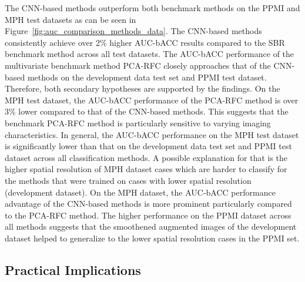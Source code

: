 The CNN-based methods outperform both benchmark methods on the PPMI and MPH test datasets 
as can be seen in Figure~\ref{fig:auc_comparison_methods_data}.
The CNN-based methods consistently achieve over 2\% higher AUC-bACC results compared to the SBR benchmark method
across all test datasets.
The AUC-bACC performance of the multivariate benchmark method PCA-RFC closely approaches that of the CNN-based methods 
on the development data test set and PPMI test dataset.
Therefore, both secondary hypotheses are supported by the findings.
On the MPH test dataset, the AUC-bACC performance of the PCA-RFC method is over 3\% lower
compared to that of the CNN-based methods.
This suggests that the benchmark PCA-RFC method is particularly sensitive to varying imaging characteristics.
In general, the AUC-bACC performance on the MPH test dataset is significantly lower 
than that on the development data test set and PPMI test dataset across all classification methods.
A possible explanation for that is the higher spatial resolution of MPH dataset cases
which are harder to classify for the methods that were trained on cases with lower spatial resolution (development dataset).
On the MPH dataset, the AUC-bACC performance advantage of the CNN-based methods is more prominent 
particularly compared to the PCA-RFC method.
The higher performance on the PPMI dataset across all methods suggests that the smoothened augmented images
of the development dataset helped to generalize to the lower spatial resolution cases in the PPMI set.


\subsection{Practical Implications}

